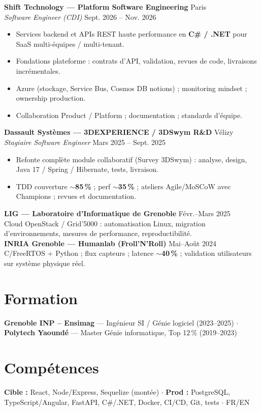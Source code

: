 \documentclass[10pt,a4paper]{article}
\begin{document}
\textbf{Shift Technology --- Platform Software Engineering} \hfill Paris\\
\textit{Software Engineer (CDI)} \hfill Sept. 2026 -- Nov. 2026
\begin{itemize}
  \item Services backend et APIs REST haute performance en \textbf{C\# / .NET} pour SaaS multi-\'equipes / multi-tenant.
  \item Fondations plateforme : contrats d'API, validation, revues de code, livraisons incr\'ementales.
  \item Azure (stockage, Service Bus, Cosmos DB notions) ; monitoring mindset ; ownership production.
  \item Collaboration Product / Platform ; documentation ; standards d'\'equipe.
\end{itemize}

\textbf{Dassault Syst\`emes --- 3DEXPERIENCE / 3DSwym R\&D} \hfill V\'elizy\\
\textit{Stagiaire Software Engineer} \hfill Mars 2025 -- Sept. 2025
\begin{itemize}
  \item Refonte compl\`ete module collaboratif (Survey 3DSwym) : analyse, design, Java 17 / Spring / Hibernate, tests, livraison.
  \item TDD couverture $\sim$\textbf{85\,\%} ; perf $\sim$\textbf{35\,\%} ; ateliers Agile/MoSCoW avec Champions ; revues et documentation.
\end{itemize}

\textbf{LIG --- Laboratoire d'Informatique de Grenoble} \hfill F\'evr.--Mars 2025\\
Cloud OpenStack / Grid'5000 : automatisation Linux, migration d'environnements, mesures de performance, reproductibilit\'e.\\[1pt]
\textbf{INRIA Grenoble --- Humanlab (Froll'N'Roll)} \hfill Mai--Ao\^ut 2024\\
C/FreeRTOS + Python ; flux capteurs ; latence $\sim$\textbf{40\,\%} ; validation utilisateurs sur syst\`eme physique r\'eel.

\section{Formation}
\textbf{Grenoble INP -- Ensimag} --- Ing\'enieur SI / G\'enie logiciel (2023--2025) $\cdot$
\textbf{Polytech Yaound\'e} --- Master G\'enie informatique, Top 12\,\% (2019--2023)

\section{Comp\'etences}
\textbf{Cible :} React, Node/Express, Sequelize (mont\'ee) $\cdot$
\textbf{Prod :} PostgreSQL, TypeScript/Angular, FastAPI, C\#/.NET, Docker, CI/CD, Git, tests $\cdot$ FR/EN
\end{document}

